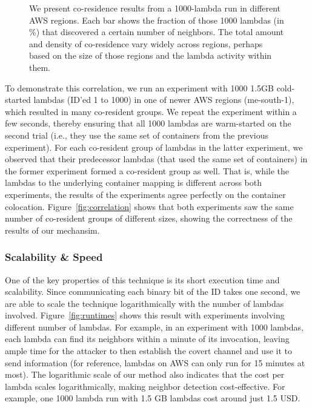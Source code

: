 \begin{figure}[!t]
\begin{subfigure}{.33\textwidth}
  \end{subfigure}
  \caption{We present co-residence results from a 1000-lambda run in different AWS regions. Each bar shows the fraction 
  of those 1000 lambdas (in \%) that discovered a certain number of neighbors. The total amount and density of co-residence 
  vary widely across regions, perhaps based on the size of those regions and the lambda activity within them. }
  \label{fig:awsregions}
  \end{figure}

To demonstrate this correlation, we run an
experiment with 1000 1.5GB cold-started lambdas (ID'ed 1 to 1000) in one of
newer AWS regions (me-south-1), which resulted in many co-resident groups.
We repeat the experiment within a few seconds, thereby ensuring that all 1000
lambdas are warm-started on the second trial (i.e., they use the same set of
containers from the previous experiment).  For each co-resident group of lambdas
in the latter experiment, we observed that their predecessor lambdas (that used
the same set of containers) in the former experiment formed a co-resident group
as well. That is, while the lambdas to the underlying container mapping is
different across both experiments, the results of the experiments agree
perfectly on the container colocation. Figure~\ref{fig:correlation} shows that
both experiments saw the same number of co-resident groups of different sizes,
showing the correctness of the results of our mechansim.

\subsubsection{Scalability \& Speed}
\label{sec:eval:scalability}
One of the key properties of this technique is its short execution time and
scalability. Since communicating each binary bit of the ID takes one second, we
are able to scale the technique logarithmically with the number of lambdas
involved. Figure~\ref{fig:runtimes} shows this result with experiments
involving different number of lambdas. For example, in an experiment with 1000
lambdas, each lambda can find its neighbors within a minute of its invocation,
leaving ample time for the attacker to then establish the covert channel and use
it to send information (for reference, lambdas on AWS can only run for 15
minutes at most).  The logarithmic scale of our method also indicates that the
cost per lambda scales logarithmically, making neighbor detection
cost-effective.  For example, one 1000 lambda run with 1.5 GB lambdas cost
around just 1.5 USD. 




